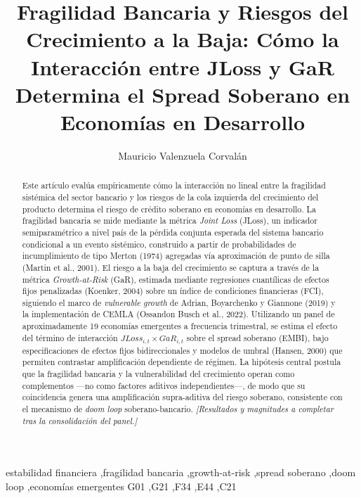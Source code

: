 \documentclass[5p,times,twocolumn,authoryear]{elsarticle}
\begin{document}
\begin{frontmatter}

\title{Fragilidad Bancaria y Riesgos del Crecimiento a la Baja: Cómo la Interacción entre JLoss y GaR Determina el Spread Soberano en Economías en Desarrollo}

\author[1]{Mauricio Valenzuela Corvalán}

\begin{abstract}
Este artículo evalúa empíricamente cómo la interacción no lineal entre la fragilidad sistémica del sector bancario y los riesgos de la cola izquierda del crecimiento del producto determina el riesgo de crédito soberano en economías en desarrollo. La fragilidad bancaria se mide mediante la métrica \textit{Joint Loss} (JLoss), un indicador semiparamétrico a nivel país de la pérdida conjunta esperada del sistema bancario condicional a un evento sistémico, construido a partir de probabilidades de incumplimiento de tipo Merton (1974) agregadas vía aproximación de punto de silla (Martin et al., 2001). El riesgo a la baja del crecimiento se captura a través de la métrica \textit{Growth-at-Risk} (GaR), estimada mediante regresiones cuantílicas de efectos fijos penalizadas (Koenker, 2004) sobre un índice de condiciones financieras (FCI), siguiendo el marco de \textit{vulnerable growth} de Adrian, Boyarchenko y Giannone (2019) y la implementación de CEMLA (Ossandon Busch et al., 2022). Utilizando un panel de aproximadamente 19 economías emergentes a frecuencia trimestral, se estima el efecto del término de interacción $JLoss_{i,t}\times GaR_{i,t}$ sobre el spread soberano (EMBI), bajo especificaciones de efectos fijos bidireccionales y modelos de umbral (Hansen, 2000) que permiten contrastar amplificación dependiente de régimen. La hipótesis central postula que la fragilidad bancaria y la vulnerabilidad del crecimiento operan como complementos —no como factores aditivos independientes—, de modo que su coincidencia genera una amplificación supra-aditiva del riesgo soberano, consistente con el mecanismo de \textit{doom loop} soberano-bancario. \textit{[Resultados y magnitudes a completar tras la consolidación del panel.]}
\end{abstract}

\begin{keyword}
estabilidad financiera \sep fragilidad bancaria \sep growth-at-risk \sep spread soberano \sep doom loop \sep economías emergentes
\JEL G01 \sep G21 \sep F34 \sep E44 \sep C21
\end{keyword}

\end{frontmatter}
\end{document}
